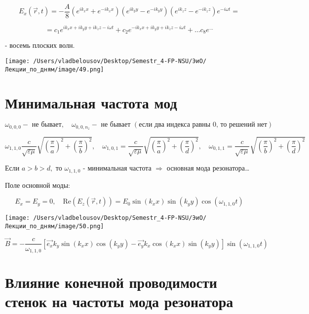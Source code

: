 \documentclass[12pt, a4paper]{report}
\begin{document}
\[ E_x(\vec{r } , t ) = -\frac{A}{8}  (e^{i k_x x} +e^{-i k_x x} )(e^{i k_y y} -e^{-i k_y y} )(e^{i k_z z} -e^{-i k_z z} )e^{- i \omega t} =   \] 

\[ = c_1 e^{i k_x x + i k_y y + i k_z z - i \omega t} +c_2 e^{-i k_x x + i k_y y + i k_z z - i \omega t} +... c_8 e^{...}   \] 

- восемь плоских волн.

\begin{center}
    \texttt{[image: /Users/vladbelousov/Desktop/Semestr\_4-FP-NSU/ЭиО/Лекции\_по\_дням/image/49.png]}
\end{center}

\section{Минимальная частота мод}

\[ \omega_{0,0,0} - \text{ не бывает} ,\quad \omega_{0,0,n_z} - \text{ не бывает } (\text{если два индекса равны 0, то решений нет} )   \] 

\[ \omega_{1,1,0} \frac{c}{\sqrt{\varepsilon \mu } } \sqrt{\left( \frac{\pi}{a}  \right) ^2 + \left( \frac{\pi}{b}  \right) ^2}  , \quad \omega_{1,0,1} = \frac{c}{\sqrt{\varepsilon \mu } } \sqrt{\left( \frac{\pi}{a}  \right) ^2 + \left( \frac{\pi}{d}  \right) ^2} , \quad \omega_{0,1,1} = \frac{c}{\sqrt{\varepsilon \mu } } \sqrt{\left( \frac{\pi}{b}  \right) ^2 + \left( \frac{\pi}{d}  \right) ^2}  \] 


Если \( a>b>d ,  \) то \( \omega_{1,1,0}  \) - минимальная частота \( \Rightarrow  \) основная мода резонатора\dots

Поле основной моды: 

\[ E_x = E_y = 0  , \quad  \mathrm{Re}  (E_z (\vec{r } , t )) = E_0 \sin (k_x x)\sin  (k_y y)\cos (\omega_{1,1,0} t) \]

\begin{center}
    \texttt{[image: /Users/vladbelousov/Desktop/Semestr\_4-FP-NSU/ЭиО/Лекции\_по\_дням/image/50.png]}
\end{center}

\[ \vec{B }  = - \frac{c}{\omega_{1,1,0} }  \left[ \vec{e_x} k_y \sin (k_x x ) \cos (k_y y ) - \vec{e_y } k_x \cos (k_x x ) \sin (k_y y )   \right]  \sin (\omega_{1,1,0} t)\] 

\section{Влияние конечной проводимости стенок на частоты мода резонатора}
\end{document}
